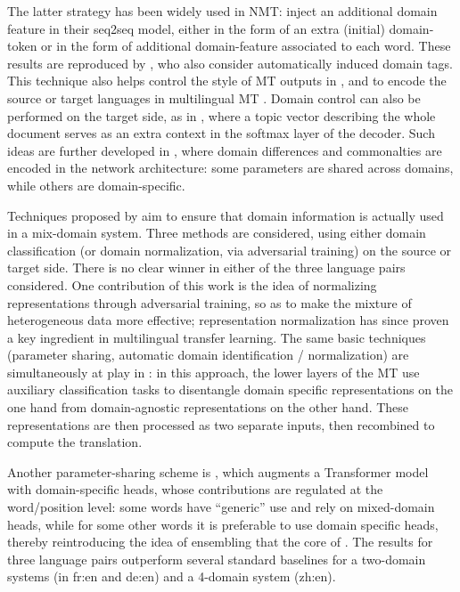 \documentclass[11pt,a4paper]{article}
\newcommand{\fyTodo}[1]{\Todo[FY:]{\textcolor{orange}{#1}}}
\begin{document}
The latter strategy has been widely used in NMT:  inject an additional domain feature in their seq2seq model, either in the form of an extra (initial) domain-token or in the form of additional domain-feature associated to each word. These results are reproduced by , who also consider automatically induced domain tags. This technique also helps control the style of MT outputs in \cite{Sennrich16politeness,Niu18multitask}, and to encode the source or target languages in multilingual MT \cite{Firat16multiway,Johnson17google}. Domain control can also be performed on the target side, as in \cite{Chen16guided}, where a topic vector describing the whole document serves as an extra context in the softmax layer of the decoder. Such ideas are further developed in \cite{Chu18multilingual,Pham19generic}, where domain differences and commonalties are encoded in the network architecture: some parameters are shared across domains, while others are domain-specific. %

Techniques proposed by \cite{Britz17mixing} aim to ensure that domain information is actually used in a mix-domain system. Three methods are considered, using either domain classification (or domain normalization, via adversarial training) on the source or target side. There is no clear winner in either of the three language pairs considered. One contribution of this work is the idea of normalizing representations through adversarial training, so as to make the mixture of heterogeneous data more effective; representation normalization has since proven a key ingredient in multilingual transfer learning.
The same basic techniques (parameter sharing, automatic domain identification / normalization) are simultaneously at play in \cite{Zeng18multidomain,Su19exploring}: in this approach, the lower layers of the MT use auxiliary classification tasks to disentangle domain specific representations on the one hand from domain-agnostic representations on the other hand. These representations are then processed as two separate inputs, then recombined to compute the translation.

Another parameter-sharing scheme is \cite{Jiang19multidomain}, which augments a Transformer model with domain-specific heads, whose contributions are regulated at the word/position level: some words have ``generic'' use and rely on mixed-domain heads, while for some other words it is preferable to use domain specific heads, thereby reintroducing the idea of ensembling that the core of \cite{Huck15mixeddomain,Saunders19ucam}. The results for three language pairs outperform several standard baselines for a two-domain systems (in fr:en and de:en) and a 4-domain system (zh:en).%
\end{document}
